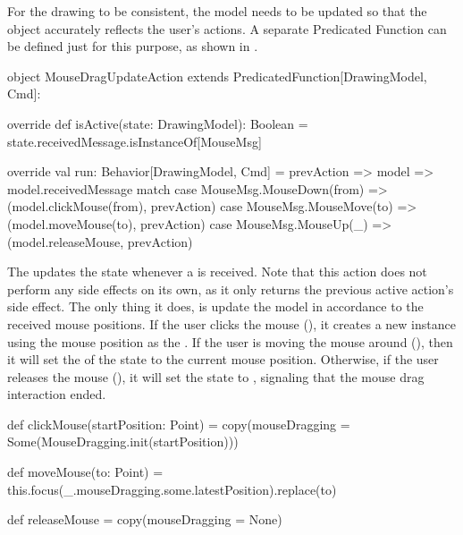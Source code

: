 For the drawing to be consistent, the model needs to be updated so that the  
object accurately reflects the user's actions. A separate Predicated Function can be defined just for this 
purpose, as shown in .

\begin{scala}[label=lst:bellevue-mouse-drag-update-action, caption=Action to update the mouse dragging state]
object MouseDragUpdateAction extends PredicatedFunction[DrawingModel, Cmd]:

  override def isActive(state: DrawingModel): Boolean =
    state.receivedMessage.isInstanceOf[MouseMsg]

  override val run: Behavior[DrawingModel, Cmd] = prevAction => model =>
    model.receivedMessage match
      case MouseMsg.MouseDown(from) => (model.clickMouse(from), prevAction)
      case MouseMsg.MouseMove(to)   => (model.moveMouse(to), prevAction)
      case MouseMsg.MouseUp(_)      => (model.releaseMouse, prevAction)
\end{scala}

The  updates the  state whenever a 
 is received. Note that this action does not perform any side effects on its own, as 
it only returns the previous active action's side effect. The only thing it does, is update the model in 
accordance to the received mouse positions. If the user clicks the mouse (), it 
creates a new  instance using the mouse position as the 
. If the user is moving the mouse around (), then it will set the 
 of the  state to the current mouse position. Otherwise, if 
the user releases the mouse (), it will set the  state to 
, signaling that the mouse drag interaction ended.

\begin{scala}[label=lst:bellevue-mouse-drag-update-action-aux, caption=Complementary functions to update the mouse dragging state]
  def clickMouse(startPosition: Point) =
    copy(mouseDragging = Some(MouseDragging.init(startPosition)))

  def moveMouse(to: Point) =
    this.focus(_.mouseDragging.some.latestPosition).replace(to)

  def releaseMouse =
    copy(mouseDragging = None)
\end{scala}

